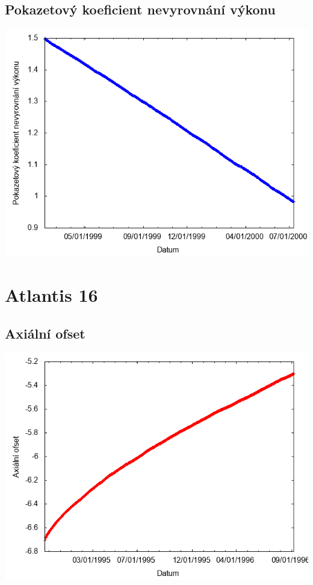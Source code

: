 \documentclass[a4paper,twoside,11pt]{article}
\begin{document}
\subsection*{Pokazetový koeficient nevyrovnání výkonu}
\begin{center}
\includegraphics[width=.8\textwidth]{graphs/Atlantis_15_fha.png}
\end{center}

\newpage
\section*{Atlantis 16}
\subsection*{Axiální ofset}
\begin{center}
\includegraphics[width=.8\textwidth]{graphs/Atlantis_16_ao.png}
\end{center}
\end{document}
